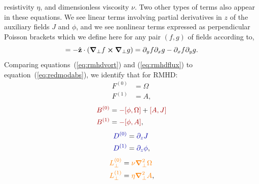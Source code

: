 \documentclass[12pt, letterpaper, oneside, leqno, openright]{memoir}
\begin{document}
resistivity $\eta$, and dimensionless viscosity $\nu$.
%
Two other types of terms also appear in these equations. We see linear
terms involving partial derivatives in $z$ of the auxiliary fields
$J$ and $\phi$, and we see nonlinear terms expressed as perpendicular
Poisson brackets which we define here for any pair $(f,g)$ of
fields according to,
%
\begin{equation}
  [f,g] = -\zhat \cdot \left(\delperp f\cross\delperp g\right) = \pardy f\pardx g - \pardx f \pardy g.
  \label{eq:pbdef}
\end{equation}
%
Comparing equations~(\ref{eq:rmhdvort}) and (\ref{eq:rmhdflux}) to equation~(\ref{eq:redmodabs}),
            \label{eq:redmodabs}
we identify that for RMHD:
%
\begin{subequations}
\begin{align}
  F^{(0)} &= \Omega  \label{eq:rmhdfzero}                                                              \\
  F^{(1)} &=  A,     \label{eq:rmhdfone}
\end{align}
\end{subequations}
%
\begin{subequations}
\begin{align}
  {\color{red!65!black}B^{(0)}} &= {\color{red!65!black}-[\phi,\Omega]} + {\color{red!65!black}[A,J]} \label{eq:rmhdbzero} \\
  {\color{red!65!black}B^{(1)}} &= {\color{red!65!black}-[\phi,A]},                                    \label{eq:rmhdbone}
\end{align}
\end{subequations}
%                                   
\begin{subequations}
\begin{align}
  {\color{blue!65!black}D^{(0)}} &= {\color{blue!65!black}\pardz J}                                   \label{eq:rmhddzero} \\
  {\color{blue!65!black}D^{(1)}} &= {\color{blue!65!black}\pardz\phi},                                \label{eq:rmhddone}
\end{align}
\end{subequations}
%
\begin{subequations}
\begin{align}
  {\color{orange}L^{(0)}_\perp} &={\color{orange}\nu \boldsymbol{\nabla}_\perp^2\Omega} \label{eq:rmhdlzero} \\
  {\color{orange}L^{(1)}_\perp} &={\color{orange}\eta\boldsymbol{\nabla}_\perp^2 A},    \label{eq:rmhdlone}
\end{align}
\end{subequations}
\end{document}
